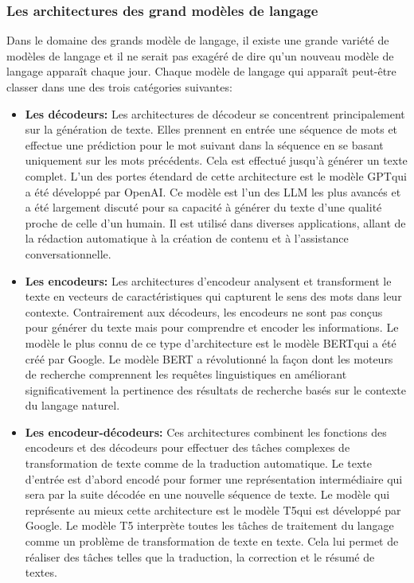 \documentclass{rapport}
\begin{document}
\subsubsection{Les architectures des grand modèles de langage}
Dans le domaine des grands modèle de langage, il existe une grande variété de modèles de langage et il ne serait pas exagéré de dire qu'un nouveau modèle de langage apparaît chaque jour. Chaque modèle de langage qui apparaît peut-être classer dans une des trois catégories suivantes: 
\begin{itemize}
    \item \textbf{Les décodeurs: }Les architectures de décodeur se concentrent principalement sur la génération de texte. Elles prennent en entrée une séquence de mots et effectue une prédiction pour le mot suivant dans la séquence en se basant uniquement sur les mots précédents. Cela est effectué jusqu'à générer un texte complet. L'un des portes étendard de cette architecture est le modèle GPT\footnotemark[1] qui a été développé par OpenAI. Ce modèle est l'un des LLM les plus avancés et a été largement discuté pour sa capacité à générer du texte d'une qualité proche de celle d'un humain. Il est utilisé dans diverses applications, allant de la rédaction automatique à la création de contenu et à l'assistance conversationnelle.
    \newpage
    \item \textbf{Les encodeurs: } Les architectures d'encodeur analysent et transforment le texte en vecteurs de caractéristiques qui capturent le sens des mots dans leur contexte. Contrairement aux décodeurs, les encodeurs ne sont pas conçus pour générer du texte mais pour comprendre et encoder les informations. Le modèle le plus connu de ce type d'architecture est le modèle BERT\footnotemark[1] qui a été créé par Google. Le modèle BERT a révolutionné la façon dont les moteurs de recherche comprennent les requêtes linguistiques en améliorant significativement la pertinence des résultats de recherche basés sur le contexte du langage naturel.
    \item \textbf{Les encodeur-décodeurs: }Ces architectures combinent les fonctions des encodeurs et des décodeurs pour effectuer des tâches complexes de transformation de texte comme de la traduction automatique. Le texte d'entrée est d'abord encodé pour former une représentation intermédiaire qui sera par la suite décodée en une nouvelle séquence de texte. Le modèle qui représente au mieux cette architecture est le modèle T5\footnotemark[2] qui est développé par Google. Le modèle T5 interprète toutes les tâches de traitement du langage comme un problème de transformation de texte en texte. Cela lui permet de réaliser des tâches telles que la traduction, la correction et le résumé de textes.
\end{itemize}
\end{document}
